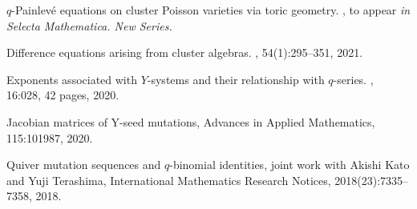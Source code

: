 \documentclass[10pt,a4paper,sans]{moderncv}        %
\begin{document}
\renewcommand{\refname}{Publications}
\begin{thebibliography}{1}

  
  {$q$}-{P}ainlev\'{e} equations on cluster {P}oisson varieties via toric geometry.
, 
\newblock to appear {\em in Selecta Mathematica. New Series.}

Difference equations arising from cluster algebras.
, 54(1):295--351, 2021.


Exponents associated with {$Y$}-systems and their relationship with
  {$q$}-series.
, 16:028, 42
  pages, 2020.

Jacobian matrices of Y-seed mutations,
\newblock Advances in Applied Mathematics, 115:101987, 2020.

Quiver mutation sequences and $q$-binomial identities,
\newblock joint work with Akishi Kato and Yuji Terashima,
\newblock International Mathematics Research Notices,
  2018(23):7335--7358, 2018.
  
\end{thebibliography}
\end{document}
